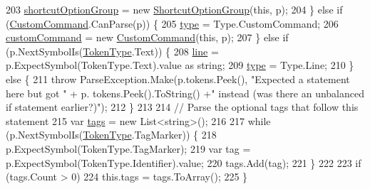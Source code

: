 \begin{DoxyCode}
203                     \hyperlink{a00168_a54d73ad69c4af4a0d61edeaea4c8ca4f}{shortcutOptionGroup} = \textcolor{keyword}{new} 
      \hyperlink{a00168_a518000e4e6219ce5f9f4229f505cd944ae8a0b2e51320b69d57d378776ee0647a}{ShortcutOptionGroup}(\textcolor{keyword}{this}, p);
204                 \} \textcolor{keywordflow}{else} \textcolor{keywordflow}{if} (\hyperlink{a00168_a518000e4e6219ce5f9f4229f505cd944af6b081742758e5cbc3a2e679e521a4fe}{CustomCommand}.CanParse(p)) \{
205                     \hyperlink{a00168_aa3fa0eb260e412720562ce06b7dc06fe}{type} = Type.CustomCommand;
206                     \hyperlink{a00168_a8a98e7d4c66f9909da865f0e671d69f2}{customCommand} = \textcolor{keyword}{new} \hyperlink{a00168_a518000e4e6219ce5f9f4229f505cd944af6b081742758e5cbc3a2e679e521a4fe}{CustomCommand}(\textcolor{keyword}{this}, p);
207                 \} \textcolor{keywordflow}{else} \textcolor{keywordflow}{if} (p.NextSymbolIs(\hyperlink{a00053_a301aa7c866593a5b625a8fc158bbeace}{TokenType}.Text)) \{
208                     \hyperlink{a00168_a37695c7b00776bb292fd64894a70fb72}{line} = p.ExpectSymbol(TokenType.Text).value as \textcolor{keywordtype}{string};
209                     \hyperlink{a00168_aa3fa0eb260e412720562ce06b7dc06fe}{type} = Type.Line;
210                 \} \textcolor{keywordflow}{else} \{
211                     \textcolor{keywordflow}{throw} ParseException.Make(p.tokens.Peek(), \textcolor{stringliteral}{"Expected a statement here but got "} + p.
      tokens.Peek().ToString() +\textcolor{stringliteral}{" instead (was there an unbalanced if statement earlier?)"});
212                 \}
213 
214                 \textcolor{comment}{// Parse the optional tags that follow this statement}
215                 var \hyperlink{a00150_a58b3a15788fd2d4127d73619dc6d04ae}{tags} = \textcolor{keyword}{new} List<string>();
216 
217                 \textcolor{keywordflow}{while} (p.NextSymbolIs(\hyperlink{a00053_a301aa7c866593a5b625a8fc158bbeace}{TokenType}.TagMarker)) \{
218                     p.ExpectSymbol(TokenType.TagMarker);
219                     var tag = p.ExpectSymbol(TokenType.Identifier).value;
220                     tags.Add(tag);
221                 \}
222 
223                 \textcolor{keywordflow}{if} (tags.Count > 0)
224                     this.tags = tags.ToArray();
225             \}
\end{DoxyCode}


